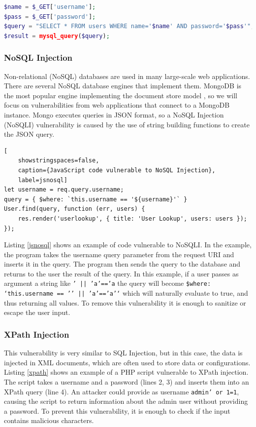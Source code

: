 \begin{lstlisting}[language=PHP,
    showstringspaces=false,
    caption={PHP code vulnerable to SQL Injection},
    label=phpsql, float]
$name = $_GET['username'];
$pass = $_GET['password'];
$query = "SELECT * FROM users WHERE name='$name' AND password='$pass'"; 
$result = mysql_query($query);
\end{lstlisting}


\subsubsection{NoSQL Injection} Non-relational (NoSQL) databases are used in many large-scale web applications. There are several NoSQL database engines that implement them. MongoDB \cite{Mongo:online} is the most popular engine implementing the document store model \cite{DBEngine7:online}, so we will focus on vulnerabilities from web applications that connect to a MongoDB instance. Mongo executes queries in JSON format, so a NoSQL Injection (NoSQLI) vulnerability is caused by the use of string building functions to create the JSON query.


\begin{lstlisting}[
    showstringspaces=false,
    caption={JavaScript code vulnerable to NoSQL Injection},
    label=jsnosql]
let username = req.query.username;
query = { $where: `this.username == '${username}'` }
User.find(query, function (err, users) {
    res.render('userlookup', { title: 'User Lookup', users: users });
});
\end{lstlisting}


Listing \ref{jsnosql} shows an example of code vulnerable to NoSQLI. 
In the example, the program takes the username query parameter from the request URI and inserts it in the query. The program then sends the query to the database and returns to the user the result of the query. In this example, if a user passes as argument a string like \texttt{' || 'a'=='a} the query will become \texttt{\$where: `this.username == '' || 'a'=='a'`} which will naturally evaluate to true, and thus returning all values. To remove this vulnerability it is enough to sanitize or escape the user input.


\subsubsection{XPath Injection} This vulnerability is very similar to SQL Injection, but in this case, the data is injected in XML documents, which are often used to store data or configurations. Listing \ref{xpath} shows an example of a PHP script vulnerable to XPath injection. The script takes a username and a password (lines 2, 3) and inserts them into an XPath query (line 4).
An attacker could provide as username \texttt{admin' or 1=1}, causing the script to return information about the admin user without providing a password.
To prevent this vulnerability, it is enough to check if the input contains malicious characters.



